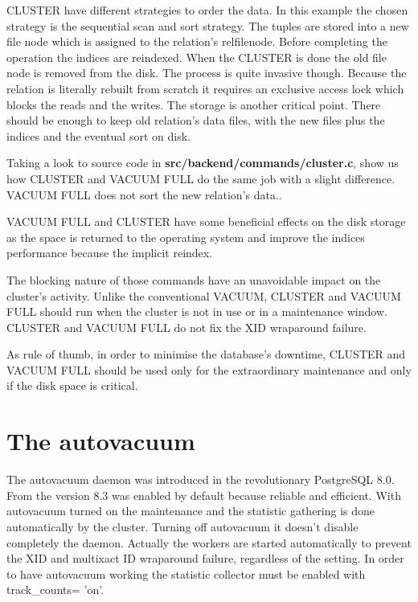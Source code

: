 CLUSTER have different strategies to order the data. In this example the chosen strategy is the sequential 
scan and sort strategy. The tuples are stored into a new file node which is assigned to the 
relation's relfilenode. Before completing the operation the indices are reindexed. When the CLUSTER is done 
the old file node is removed from the disk. The process is quite invasive though. Because the 
relation is literally rebuilt from scratch it requires an exclusive access lock which blocks the reads and 
the writes. The storage is another critical point. There should be enough to keep old relation's data 
files, with the new files plus the indices and the eventual sort on disk.\newline

Taking a look to source code in \textbf{src/backend/commands/cluster.c}, show us how CLUSTER and VACUUM 
FULL do the same job with a slight difference. VACUUM FULL does not sort the new relation's data..\newline

VACUUM FULL and CLUSTER have some beneficial effects on the disk storage as the space is returned to the 
operating system and improve the indices performance because the implicit reindex.\newline

The blocking nature of those commands have an unavoidable impact on the cluster's activity. Unlike the 
conventional VACUUM, CLUSTER and VACUUM FULL should run when the cluster is not in use or in a maintenance 
window. CLUSTER and VACUUM FULL do not fix the XID wraparound failure.\newline

As rule of thumb, in order to minimise the database's downtime, CLUSTER and VACUUM FULL should be used only 
for the extraordinary maintenance and only if the disk space is critical.
 


\section{The autovacuum}
\label{sec:AUTOVACUUM}
The autovacuum daemon was introduced in the revolutionary PostgreSQL 8.0. From the version 8.3 was enabled 
by default because reliable and efficient. With autovacuum turned on the maintenance and the statistic 
gathering is done automatically by the cluster. Turning off autovacuum it doesn't disable completely the 
daemon. Actually the workers are started automatically to prevent the XID and multixact ID wraparound 
failure, regardless of the setting. In order to have autovacuum working the statistic collector must be 
enabled with track\_counts= 'on'.\newline

